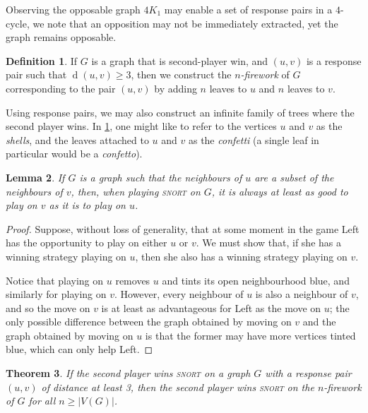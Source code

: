 \documentclass[11pt]{article}
\newtheorem{theorem}{Theorem}[section]
\newtheorem{lemma}[theorem]{Lemma}
\theoremstyle{definition}
\newtheorem{definition}[theorem]{Definition}
\DeclareMathOperator{\dist}{d}
\begin{document}
Observing the opposable graph $4K_1$ may enable a set of response pairs in a
$4$-cycle, we note that an opposition may not be immediately extracted, yet the
graph remains opposable.

\begin{definition}
    \label{def:firework}
    If $G$ is a graph that is second-player win, and $(u,v)$ is a response pair
    such that $\dist(u,v)\geq3$, then we construct the $n$\emph{-firework} of
    $G$ corresponding to the pair $(u,v)$ by adding $n$ leaves to $u$ and $n$
    leaves to $v$.
\end{definition}

Using response pairs, we may also construct an infinite family of trees where
the second player wins. In \cref{def:firework}, one might like to refer to the
vertices $u$ and $v$ as the \emph{shells}, and the leaves attached to $u$ and
$v$ as the \emph{confetti} (a single leaf in particular would be a
\emph{confetto}).

\begin{lemma}
    \label{lem: bad-moves}
    If $G$ is a graph such that the neighbours of $u$ are a subset of the
    neighbours of $v$, then, when playing \textsc{snort} on $G$, it is always
    at least as good to play on $v$ as it is to play on $u$.
\end{lemma}

\begin{proof}
    Suppose, without loss of generality, that at some moment in the game Left
    has the opportunity to play on either $u$ or $v$. We must show that, if she
    has a winning strategy playing on $u$, then she also has a winning strategy
    playing on $v$.

    Notice that playing on $u$ removes $u$ and tints its open neighbourhood
    blue, and similarly for playing on $v$. However, every neighbour of $u$ is
    also a neighbour of $v$, and so the move on $v$ is at least as advantageous
    for Left as the move on $u$; the only possible difference between the graph
    obtained by moving on $v$ and the graph obtained by moving on $u$ is that
    the former may have more vertices tinted blue, which can only help Left.
\end{proof}

\begin{theorem}
    \label{thm: firework}
    If the second player wins \textsc{snort} on a graph $G$ with a response
    pair $(u,v)$ of distance at least 3, then the second player wins
    \textsc{snort} on the $n$-firework of $G$ for all $n\geq|V(G)|$.
\end{theorem}
\end{document}

